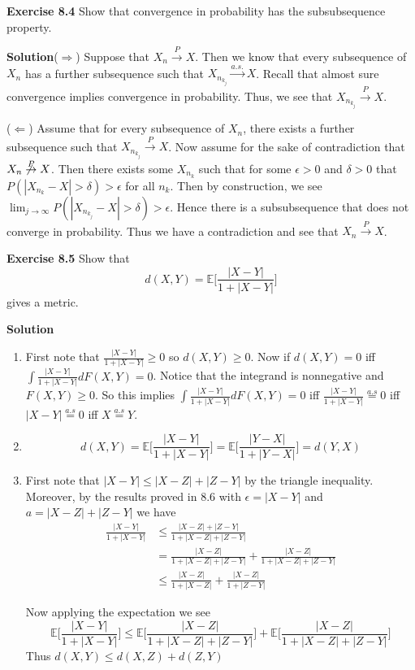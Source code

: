 \documentclass[12pt]{article}  %
\newcommand{\e}{{\epsilon}}
\newcommand{\E}{{\mathbb{E}}}
\begin{document}
\textbf{Exercise 8.4} Show that convergence in probability has the subsubsequence property. 

\textbf{Solution}($\Longrightarrow$) Suppose that $X_n\overset{P}{\to}X$. Then we know that every subsequence of $X_n$ has a further subsequence such that $X_{n_{k_j}}\overset{a.s.}{\to}X$. Recall that almost sure convergence implies convergence in probability. Thus, we see that $X_{n_{k_j}}\overset{P}{\to}X$. 

($\Longleftarrow$) Assume that for every subsequence of $X_n$, there exists a further subsequence such that $X_{n_{k_j}}\overset{P}{\to}X$. Now assume for the sake of contradiction that $X_n\not\overset{P}{\to}X$. Then there exists some $X_{n_k}$ such that for some $\e>0$ and $\delta>0$ that $P(|X_{n_k}-X|>\delta)>\e$ for all $n_k$. Then by construction, we see $\lim_{j\to\infty}P(|X_{n_{k_j}}-X|>\delta)>\e$. Hence there is a subsubsequence that does not converge in probability. Thus we have a contradiction and see that $X_n\overset{P}{\to}X$. 
\newpage

\textbf{Exercise 8.5} Show that $$d(X,Y) = \E\bigg[\frac{|X-Y|}{1+|X-Y|}\bigg]$$ gives a metric.

\textbf{Solution}
\begin{enumerate}
\item First note that $\frac{|X-Y|}{1+|X-Y|}\geq0$ so $d(X,Y)\geq 0$. Now if $d(X,Y) = 0$ iff $\int\frac{|X-Y|}{1+|X-Y|}dF(X,Y) = 0$. Notice that the integrand is nonnegative and $F(X,Y)\geq0$. So this implies  $\int\frac{|X-Y|}{1+|X-Y|}dF(X,Y) = 0$ iff $\frac{|X-Y|}{1+|X-Y|} \overset{a.s}{=} 0$ iff $|X-Y| \overset{a.s}{=} 0$ iff $X \overset{a.s}{=} Y$. 
\item $$d(X,Y) = \E\bigg[\frac{|X-Y|}{1+|X-Y|}\bigg] = \E\bigg[\frac{|Y-X|}{1+|Y-X|}\bigg] = d(Y,X)$$
\item First note that $|X-Y|\leq |X-Z| + |Z-Y|$ by the triangle inequality. Moreover, by the results proved in 8.6 with $\e = |X-Y|$ and $a = |X-Z| + |Z-Y|$  we have 
\begin{align*}
\frac{|X-Y|}{1 + |X-Y|}&\leq \frac{|X-Z| + |Z-Y|}{1 + |X-Z| + |Z-Y|} \\
&= \frac{|X-Z|}{1 + |X-Z| + |Z-Y|} + \frac{|X-Z|}{1 + |X-Z| + |Z-Y|}\\
&\leq \frac{|X-Z|}{1 + |X-Z|} + \frac{|X-Z|}{1 + |Z-Y|}\end{align*}

Now applying the expectation we see $$\E\bigg[\frac{|X-Y|}{1 + |X-Y|}\bigg]\leq \E\bigg[\frac{|X-Z|}{1 + |X-Z| + |Z-Y|}\bigg] + \E\bigg[\frac{|X-Z|}{1 + |X-Z| + |Z-Y|}\bigg]$$
Thus $d(X,Y)\leq d(X,Z) + d(Z,Y)$
\end{enumerate}
\newpage
\end{document}
